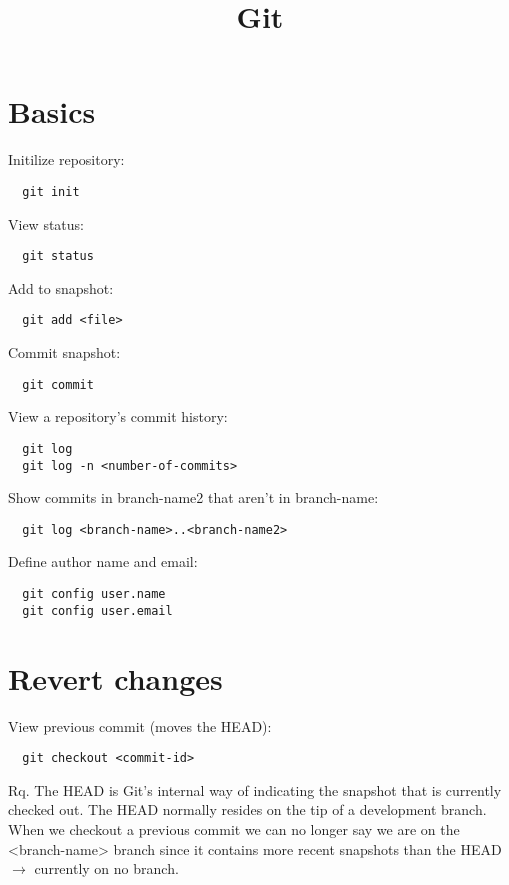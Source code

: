 \documentclass[french]{article}
\title{Git}
\begin{document}
\date{}

\maketitle

\setlength{\parindent}{0cm}

\section{Basics}

Initilize repository:
\begin{verbatim}
  git init
\end{verbatim}

View status:
\begin{verbatim}
  git status
\end{verbatim}

Add to snapshot:
\begin{verbatim}
  git add <file>
\end{verbatim}

Commit snapshot:
\begin{verbatim}
  git commit
\end{verbatim}

View a repository's commit history:
\begin{verbatim}
  git log
  git log -n <number-of-commits>
\end{verbatim}

Show commits in branch-name2 that aren't in branch-name:
\begin{verbatim}
  git log <branch-name>..<branch-name2>
\end{verbatim}

Define author name and email:
\begin{verbatim}
  git config user.name
  git config user.email
\end{verbatim}

\section{Revert changes}

View previous commit (moves the HEAD):
\begin{verbatim}
  git checkout <commit-id>
\end{verbatim}
Rq. The HEAD is Git's internal way of indicating the snapshot that is currently checked out. The HEAD normally resides on the tip of a development branch. When we checkout a previous commit we can no longer say we are on the <branch-name> branch since it contains more recent snapshots than the HEAD $\rightarrow$ currently on no branch.\\
\end{document}
